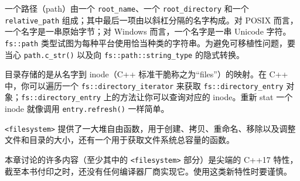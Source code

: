 一个路径（path）由一个 \texttt{root\_\allowbreak{}name}、一个 \texttt{root\_\allowbreak{}directory} 和一个 \texttt{relative\_\allowbreak{}path} 组成；其中最后一项由以斜杠分隔的名字构成。对 POSIX 而言，一个名字是一串原始字节；对 Windows 而言，一个名字是一串 Unicode 字符。\texttt{fs::\allowbreak{}path} 类型试图为每种平台使用恰当种类的字符串。为避免可移植性问题，要当心 \texttt{path.\allowbreak{}c\_\allowbreak{}str(\allowbreak{})\allowbreak{}} 以及向 \texttt{fs::\allowbreak{}path::\allowbreak{}string\_\allowbreak{}type} 的隐式转换。

目录存储的是从名字到 inode（C++ 标准干脆称之为“files”）的映射。在 C++ 中，你可以遍历一个 \texttt{fs::\allowbreak{}directory\_\allowbreak{}iterator} 来获取 \texttt{fs::\allowbreak{}directory\_\allowbreak{}entry} 对象；\texttt{fs::\allowbreak{}directory\_\allowbreak{}entry} 上的方法让你可以查询对应的 inode。重新 stat 一个 inode 就像调用 \texttt{entry.\allowbreak{}refresh(\allowbreak{})\allowbreak{}} 一样简单。

\texttt{<filesystem>\allowbreak{}} 提供了一大堆自由函数，用于创建、拷贝、重命名、移除以及调整文件和目录的大小，还有一个用于获取文件系统总容量的函数。

本章讨论的许多内容（至少其中的 \texttt{<filesystem>\allowbreak{}} 部分）是尖端的 C++17 特性，截至本书付印之时，还没有任何编译器厂商实现它。使用这类新特性时要谨慎。
